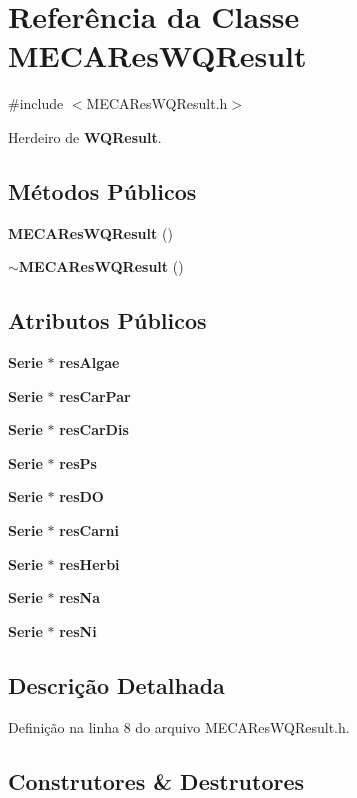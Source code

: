 \section{Referência da Classe M\+E\+C\+A\+Res\+W\+Q\+Result}
\label{class_m_e_c_a_res_w_q_result}


{\ttfamily \#include $<$M\+E\+C\+A\+Res\+W\+Q\+Result.\+h$>$}



Herdeiro de {\bf W\+Q\+Result}.

\subsection*{Métodos Públicos}
\begin{DoxyCompactItemize}
\item 
{\bf M\+E\+C\+A\+Res\+W\+Q\+Result} ()
\item 
{\bf $\sim$\+M\+E\+C\+A\+Res\+W\+Q\+Result} ()
\end{DoxyCompactItemize}
\subsection*{Atributos Públicos}
\begin{DoxyCompactItemize}
\item 
{\bf Serie} $\ast$ {\bf res\+Algae}
\item 
{\bf Serie} $\ast$ {\bf res\+Car\+Par}
\item 
{\bf Serie} $\ast$ {\bf res\+Car\+Dis}
\item 
{\bf Serie} $\ast$ {\bf res\+Ps}
\item 
{\bf Serie} $\ast$ {\bf res\+DO}
\item 
{\bf Serie} $\ast$ {\bf res\+Carni}
\item 
{\bf Serie} $\ast$ {\bf res\+Herbi}
\item 
{\bf Serie} $\ast$ {\bf res\+Na}
\item 
{\bf Serie} $\ast$ {\bf res\+Ni}
\end{DoxyCompactItemize}


\subsection{Descrição Detalhada}


Definição na linha 8 do arquivo M\+E\+C\+A\+Res\+W\+Q\+Result.\+h.



\subsection{Construtores \& Destrutores}
